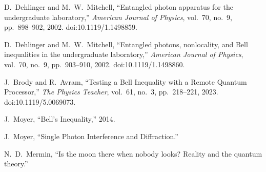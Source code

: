 \documentclass[letter,scriptaddress,twocolumn, prl,showkeys]{revtex4}
\begin{document}
\begin{thebibliography}{}

D.~Dehlinger and M.~W.~Mitchell,
``Entangled photon apparatus for the undergraduate laboratory,''
\emph{American Journal of Physics}, vol.~70, no.~9, pp.~898--902, 2002.
doi:10.1119/1.1498859.

D.~Dehlinger and M.~W.~Mitchell,
``Entangled photons, nonlocality, and Bell inequalities in the undergraduate laboratory,''
\emph{American Journal of Physics}, vol.~70, no.~9, pp.~903--910, 2002.
doi:10.1119/1.1498860.

J.~Brody and R.~Avram,
``Testing a Bell Inequality with a Remote Quantum Processor,''
\emph{The Physics Teacher}, vol.~61, no.~3, pp.~218--221, 2023.
doi:10.1119/5.0069073.

J.~Moyer,
``Bell’s Inequality,''
2014.

J.~Moyer,
``Single Photon Interference and Diffraction.''

N.~D.~Mermin,
``Is the moon there when nobody looks? Reality and the quantum theory.''

\end{thebibliography}
\end{document}
